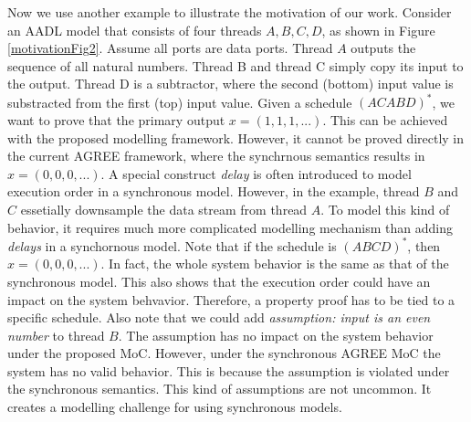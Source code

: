 Now we use another example to illustrate the motivation of our work.
Consider an AADL model that consists of four threads $A, B, C, D$, as shown in Figure \ref{motivationFig2}. Assume all ports are data ports. Thread $A$ outputs the sequence of all natural numbers. Thread B and thread C simply copy its input to the output. Thread D is a subtractor, where the second (bottom) input value is substracted from the first (top) input value. Given a schedule $(ACABD)^*$, we want to prove that the primary output $x = (1,1,1,...)$. This can be achieved with the proposed modelling framework. However, it cannot be proved directly in the current AGREE framework, where the synchrnous semantics results in $x= (0,0,0,...)$. A special construct \emph{delay} is often introduced to model execution order in a synchronous model. However, in the example, thread $B$ and $C$ essetially downsample the data stream from thread $A$. To model this kind of behavior, it requires much more complicated modelling mechanism than adding \emph{delays} in a synchornous model. 
Note that if the schedule is $(ABCD)^*$, then $x=(0,0,0,...)$. In fact, the whole system behavior is the same as that of the synchronous model. This also shows that the execution order could have an impact on the system behvavior. Therefore, a property proof has to be tied to a specific schedule.
Also note that we could add \emph{assumption: input is an even number} to thread $B$. The assumption has no impact on the system behavior under the proposed MoC. However, under the synchronous AGREE MoC the system has no valid behavior. This is because the assumption is violated under the synchronous semantics. This kind of assumptions are not uncommon. It creates a modelling challenge for using synchronous models. 

